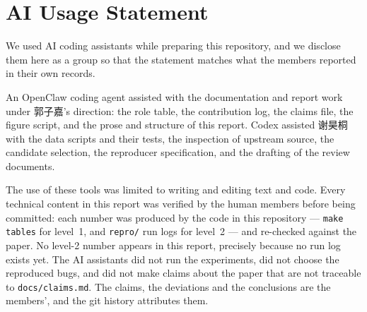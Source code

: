\documentclass[11pt]{article}
\begin{document}
\section*{AI Usage Statement}

We used AI coding assistants while preparing this repository, and we
disclose them here as a group so that the statement matches what the
members reported in their own records.

An OpenClaw coding agent assisted with the documentation and report work
under 郭子嘉's direction: the role table, the contribution log, the claims
file, the figure script, and the prose and structure of this report. Codex
assisted 谢昊桐 with the data scripts and their tests, the inspection of
upstream source, the candidate selection, the reproducer specification, and
the drafting of the review documents.

The use of these tools was limited to writing and editing text and code.
Every technical content in this report was verified by the human members
before being committed: each number was produced by the code in this
repository --- \texttt{make tables} for level~1, and \texttt{repro/} run logs
for level~2 --- and re-checked against the paper. No level-2 number appears
in this report, precisely because no run log exists yet. The AI assistants
did not run the experiments, did not choose the reproduced bugs, and did not
make claims about the paper that are not traceable to
\texttt{docs/claims.md}. The claims, the deviations and the conclusions are
the members', and the git history attributes them.



\end{document}
